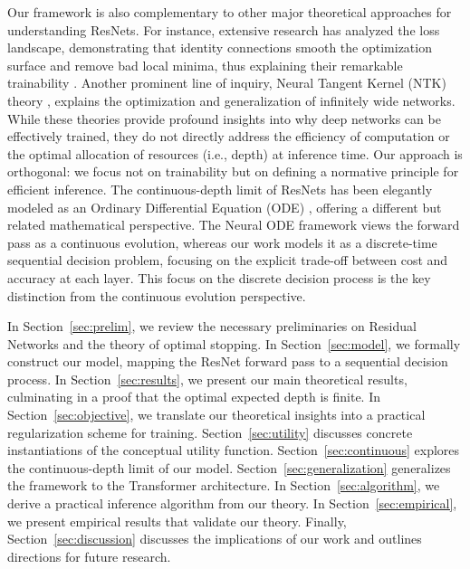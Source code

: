 \documentclass[12pt]{imsart}
\theoremstyle{plain}
\theoremstyle{definition}
\begin{document}
Our framework is also complementary to other major theoretical approaches for understanding ResNets. For instance, extensive research has analyzed the loss landscape, demonstrating that identity connections smooth the optimization surface and remove bad local minima, thus explaining their remarkable trainability \cite{Li2018}. Another prominent line of inquiry, Neural Tangent Kernel (NTK) theory \cite{Jacot2018}, explains the optimization and generalization of infinitely wide networks. While these theories provide profound insights into why deep networks can be effectively trained, they do not directly address the efficiency of computation or the optimal allocation of resources (i.e., depth) at inference time. Our approach is orthogonal: we focus not on trainability but on defining a normative principle for efficient inference. The continuous-depth limit of ResNets has been elegantly modeled as an Ordinary Differential Equation (ODE) \cite{Chen2018}, offering a different but related mathematical perspective. The Neural ODE framework views the forward pass as a continuous evolution, whereas our work models it as a discrete-time sequential decision problem, focusing on the explicit trade-off between cost and accuracy at each layer. This focus on the discrete decision process is the key distinction from the continuous evolution perspective.

In Section~\ref{sec:prelim}, we review the necessary preliminaries on Residual Networks and the theory of optimal stopping. In Section~\ref{sec:model}, we formally construct our model, mapping the ResNet forward pass to a sequential decision process. In Section~\ref{sec:results}, we present our main theoretical results, culminating in a proof that the optimal expected depth is finite. In Section~\ref{sec:objective}, we translate our theoretical insights into a practical regularization scheme for training. Section~\ref{sec:utility} discusses concrete instantiations of the conceptual utility function. Section~\ref{sec:continuous} explores the continuous-depth limit of our model. Section~\ref{sec:generalization} generalizes the framework to the Transformer architecture. In Section~\ref{sec:algorithm}, we derive a practical inference algorithm from our theory. In Section~\ref{sec:empirical}, we present empirical results that validate our theory. Finally, Section~\ref{sec:discussion} discusses the implications of our work and outlines directions for future research.

\end{document}
